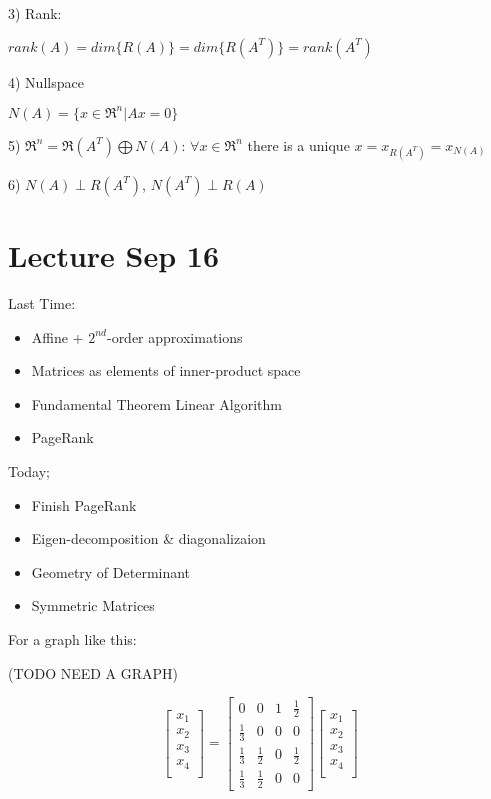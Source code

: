 3) Rank:

$rank(A) = dim\{R(A)\} = dim\{R(A^T)\} = rank(A^T)$

4) Nullspace

$N(A) = \{x\in \Re^n | Ax = 0\}$

5) $\Re^n = \Re(A^T) \bigoplus N(A)$: $\forall x\in \Re^n$ there is a unique $x = x_{R(A^T)} = x_{N(A)}$ 

6) $N(A) \perp R(A^T)$, $N(A^T) \perp R(A)$


\section{Lecture Sep 16}

Last Time:

\begin{itemize}
	\item Affine + $2^{nd}$-order approximations
	
	\item Matrices as elements of inner-product space
	
	\item Fundamental Theorem Linear Algorithm
	
	\item PageRank
\end{itemize}



Today;

\begin{itemize}
	\item Finish PageRank
	
	\item Eigen-decomposition \& diagonalizaion
	
	\item Geometry of Determinant
	
	\item Symmetric Matrices
\end{itemize}

For a graph like this:

(TODO NEED A GRAPH)


$$
\left[
\begin{matrix}
x_1 \\
x_2 \\
x_3\\
x_4\\
\end{matrix}
\right] =
\left[
\begin{matrix}
0 & 0 & 1 & \frac{1}{2} \\
\frac{1}{3} & 0 & 0& 0 \\
\frac{1}{3}& \frac{1}{2} & 0 & \frac{1}{2} \\
\frac{1}{3} & \frac{1}{2} & 0 & 0 
\end{matrix}
\right]
\left[
\begin{matrix}
x_1 \\
x_2 \\
x_3\\
x_4\\
\end{matrix}
\right]
$$

